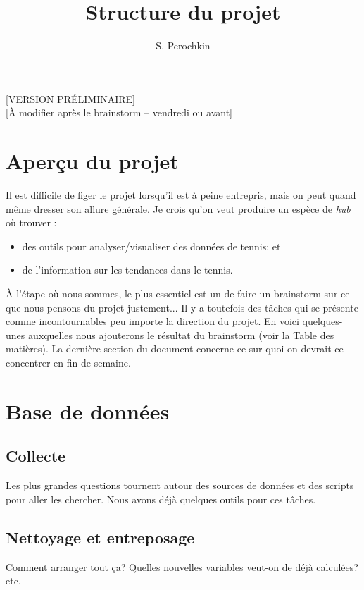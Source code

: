 \documentclass[12pt]{article}
\begin{document}

\title{\bf Structure du projet}

\author{S. Perochkin}
\maketitle


[VERSION PRÉLIMINAIRE]\\ 

[À modifier après le brainstorm -- vendredi ou avant]

\section*{Aperçu du projet}

Il est difficile de figer le projet lorsqu'il est à peine entrepris, mais on peut quand même dresser son allure générale. Je crois qu'on veut produire un espèce de \textit{hub} où trouver :
\begin{itemize}
\item des outils pour analyser/visualiser des données de tennis; et
\item de l'information sur les tendances dans le tennis.
\end{itemize}
À l'étape où nous sommes, le plus essentiel est un de faire un brainstorm sur ce que nous pensons du projet justement... Il y a toutefois des tâches qui se présente comme incontournables peu importe la direction du projet. En voici quelques-unes auxquelles nous ajouterons le résultat du brainstorm (voir la Table des matières). La dernière section du document concerne ce sur quoi on devrait ce concentrer en fin de semaine.

\newpage
\tableofcontents

\newpage
\section{Base de données}
\subsection{Collecte}
Les plus grandes questions tournent autour des sources de données et des scripts pour aller les chercher. Nous avons déjà quelques outils pour ces tâches.

\subsection{Nettoyage et entreposage}
Comment arranger tout ça? Quelles nouvelles variables veut-on de déjà calculées? etc.
\end{document}
